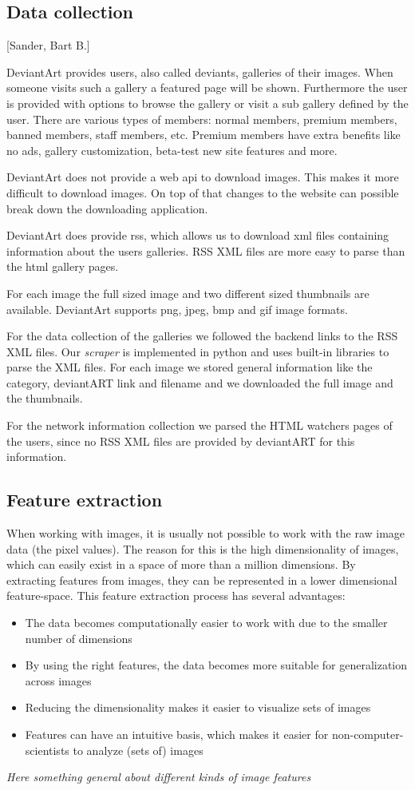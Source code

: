 \subsection{Data collection}
[Sander, Bart B.]

DeviantArt provides users, also called deviants, galleries of their images. 
When someone visits such a gallery a featured page will be shown. Furthermore
the user is provided with options to browse the gallery or visit a sub gallery
defined by the user. There are various types of members: normal members, premium 
members, banned members, staff members, etc. Premium members have extra benefits
like no ads, gallery customization, beta-test new site features and more.

DeviantArt does not provide a web api to download images. This makes it more 
difficult to download images. On top of that changes to the website can possible break
down the downloading application.

DeviantArt does provide rss, which allows us to download xml files containing 
information about the users galleries. RSS XML files are more easy to parse
than the html gallery pages.

For each image the full sized image and two different sized thumbnails are 
available. DeviantArt supports png, jpeg, bmp and gif image formats.

For the data collection of the galleries we followed the backend links to
the RSS XML files. Our \textit{scraper} is implemented in python and uses
built-in libraries to parse the XML files. For each image we stored general 
information like the category, deviantART link and filename and we downloaded
the full image and the thumbnails.

For the network information collection we parsed the HTML watchers pages
of the users, since no RSS XML files are provided by deviantART for this
information.

\subsection{Feature extraction}
When working with images, it is usually not possible to work with the raw image data (the pixel values). The reason for this is the high dimensionality of images, which can easily exist in a space of more than a million dimensions. By extracting features from images, they can be represented in a lower dimensional feature-space.  This feature extraction process has several advantages:
\begin{itemize}
\item The data becomes computationally easier to work with due to the smaller number of dimensions
\item By using the right features, the data becomes more suitable for generalization across images
\item Reducing the dimensionality makes it easier to visualize sets of images
\item Features can have an intuitive basis, which makes it easier for non-computer-scientists to analyze (sets of) images
\end{itemize}
\textit{Here something general about different kinds of image features}

